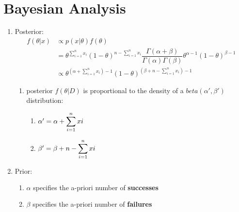 \section{Bayesian Analysis \cite{ism-1}} \label{Beta Distribution: Bayesian Analysis}

\begin{enumerate}
    \item Posterior: \cite{ism-1}
    \begin{align*}
         f(\theta|x) 
         &\propto p(x|\theta) f (\theta) \\
         &= \theta^{\sum^{n}_{i=1} x_i} 
            (1 - \theta)^{n - \sum^{n}_{i=1} x_i}
            \dfrac{\Gamma (\alpha + \beta)}{\Gamma (\alpha)\Gamma (\beta)}
            \theta^{\alpha-1} (1 - \theta)^{\beta-1} \\
        &\propto \theta^{(\alpha + \sum^{n}_{i=1} x_i)-1} 
            (1-\theta)^{(\beta + n - \sum^{n}_{i=1} x_i)-1} 
    \end{align*}

    \begin{enumerate}
        \item[] posterior $f (\theta|D)$ is proportional to the density of a $beta(\alpha', \beta')$ distribution:
        \begin{enumerate}
            \item $\alpha' = \alpha + \displaystyle\sum^{n}_{i=1} xi$

            \item $\beta' = \beta + n - \displaystyle\sum^{n}_{i=1} xi$
        
        \end{enumerate}

    \end{enumerate}

    \item Prior:
    \begin{enumerate}
        \item $\alpha$ specifies the a-priori number of \textbf{successes}

        \item $\beta$ specifies the a-priori number of \textbf{failures}

    \end{enumerate}

\end{enumerate}







